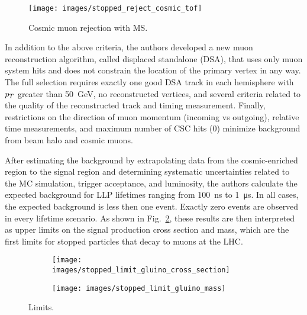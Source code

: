 \documentclass[12pt]{article}
\begin{document}
        \noindent \begin{figure}[htbp] \begin{center}
        \texttt{[image: images/stopped\_reject\_cosmic\_tof]}
        \caption{Cosmic muon rejection with MS.}
        \label{stopped_muon_differentiation}
        \end{center} \end{figure}

        In addition to the above criteria, the authors developed a new muon reconstruction algorithm, called displaced standalone (DSA), that uses only muon system hits and does not constrain the location of the primary vertex in any way. The full selection requires exactly one good DSA track in each hemisphere with $p_T$ greater than \SI{50}{\giga\electronvolt}, no reconstructed vertices, and several criteria related to the quality of the reconstructed track and timing measurement. Finally, restrictions on the direction of muon momentum (incoming vs outgoing), relative time measurements, and maximum number of CSC hits (0) minimize background from beam halo and cosmic muons.

        After estimating the background by extrapolating data from the cosmic-enriched region to the signal region and determining systematic uncertainties related to the MC simulation, trigger acceptance, and luminosity, the authors calculate the expected background for LLP lifetimes ranging from \SI{100}{\nano\s} to \SI{1}{\micro\s}. In all cases, the expected background is less then one event. Exactly zero events are observed in every lifetime scenario. As shown in Fig.~\ref{stopped_limits}, these results are then interpreted as upper limits on the signal production cross section and mass, which are the first limits for stopped particles that decay to muons at the LHC.

        \noindent \begin{figure}[htbp] \begin{center}
        \begin{subfigure}[htbp]{0.5\textwidth} \begin{center}
        \texttt{[image: images/stopped\_limit\_gluino\_cross\_section]}
        \end{center} \end{subfigure}
        \begin{subfigure}[htbp]{0.45\textwidth} \begin{center}
        \texttt{[image: images/stopped\_limit\_gluino\_mass]}
        \end{center} \end{subfigure}
        \caption{Limits.}
        \label{stopped_limits}
        \end{center} \end{figure}
\end{document}
